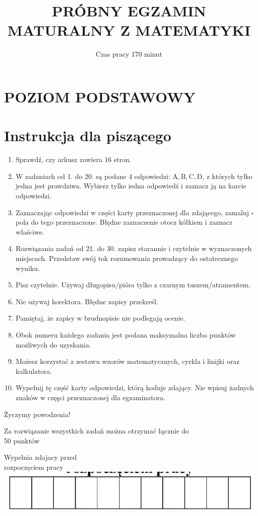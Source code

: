 \documentclass[10pt]{article}
\title{PRÓBNY EGZAMIN MATURALNY Z MATEMATYKI }
\author{Czas pracy 170 minut}
\date{}
\begin{document}
\maketitle
\section*{POZIOM PODSTAWOWY}


\section*{Instrukcja dla piszącego}
\begin{enumerate}
  \item Sprawdź, czy arkusz zawiera 16 stron.
  \item W zadaniach od 1. do 20. są podane 4 odpowiedzi: \(\mathrm{A}, \mathrm{B}, \mathrm{C}, \mathrm{D}\), z których tylko jedna jest prawdziwa. Wybierz tylko iedna odpowiedź i zaznacz ją na karcie odpowiedzi.
  \item Zaznaczając odpowiedzi w części karty przeznaczonej dla zdającego, zamaluj \(\square\) pola do tego przeznaczone. Błędne zaznaczenie otocz kółkiem i zaznacz właściwe.
  \item Rozwiązania zadań od 21. do 30. zapisz starannie i czytelnie w wyznaczonych miejscach. Przedstaw swój tok rozumowania prowadzący do ostatecznego wyniku.
  \item Pisz czytelnie. Używaj długopisu/pióra tylko z czarnym tuszem/atramentem.
  \item Nie używaj korektora. Błędne zapisy przekreśl.
  \item Pamiętaj, że zapisy w brudnopisie nie podlegają ocenie.
  \item Obok numeru każdego zadania jest podana maksymalna liczba punktów możliwych do uzyskania.
  \item Możesz korzystać z zestawu wzorów matematycznych, cyrkla i linijki oraz kalkulatora.
  \item Wypełnij tę część karty odpowiedzi, którą koduje zdający. Nie wpisuj żadnych znaków w częşci przeznaczonej dla egzaminatora.
\end{enumerate}

Życzymy powodzenia!

Za rozwiązanie wszystkich zadań można otrzymać łącznie do\\
50 punktów

Wypelnia zdajacy przed\\
rozpoczęciem pracy\\
\includegraphics[max width=\textwidth, center]{2024_11_21_6438f6dbc3784fe6d1deg-01}
\end{document}
